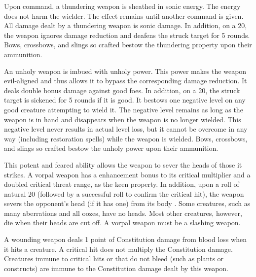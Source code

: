  Upon command, a thundering weapon is sheathed in sonic energy. The energy does not harm the wielder. The effect remains until another command is given. All damage dealt by a thundering weapon is sonic damage. In addition, on a 20, the weapon ignores damage reduction and deafens the struck target for 5 rounds. Bows, crossbows, and slings so crafted bestow the thundering property upon their ammunition.


 An unholy weapon is imbued with unholy power. This power makes the weapon evil-aligned and thus allows it to bypass the corresponding damage reduction. It deals double bonus damage against good foes. In addition, on a 20, the struck target is sickened for 5 rounds if it is good. It bestows one negative level on any good creature attempting to wield it. The negative level remains as long as the weapon is in hand and disappears when the weapon is no longer wielded. This negative level never results in actual level loss, but it cannot be overcome in any way (including restoration spells) while the weapon is wielded. Bows, crossbows, and slings so crafted bestow the unholy power upon their ammunition.


 This potent and feared ability allows the weapon to sever the heads of those it strikes. A vorpal weapon has a  enhancement bonus to its critical multiplier and a doubled critical threat range, as the keen property. In addition, upon a roll of natural 20 (followed by a successful roll to confirm the critical hit), the weapon severs the opponent's head (if it has one) from its body . Some creatures, such as many aberrations and all oozes, have no heads. Most other creatures, however, die when their heads are cut off. A vorpal weapon must be a slashing weapon.


 A wounding weapon deals 1 point of Constitution damage from blood loss when it hits a creature. A critical hit does not multiply the Constitution damage. Creatures immune to critical hits or that do not bleed (such as plants or constructs) are immune to the Constitution damage dealt by this weapon.

